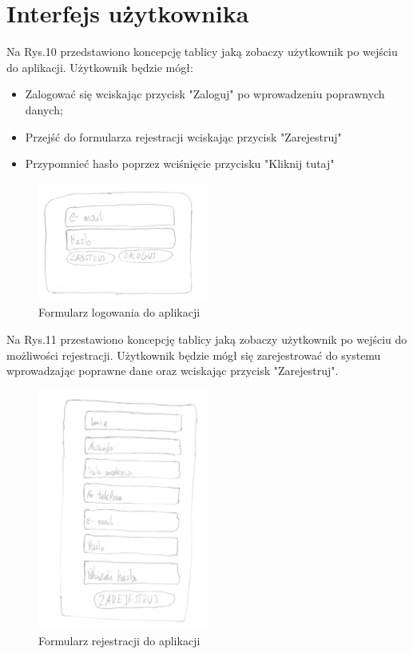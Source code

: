 \documentclass[12pt, letterpaper]{article}
\begin{document}
		\section{Interfejs użytkownika}
		
		Na Rys.10 przedstawiono koncepcję tablicy jaką zobaczy użytkownik po wejściu do aplikacji. Użytkownik będzie mógł:
		\begin{itemize}
				\item Zalogować się wciskając przycisk "Zaloguj" po wprowadzeniu poprawnych danych;
				\item Przejść do formularza rejestracji wciskając przycisk "Zarejestruj"
				\item Przypomnieć hasło poprzez wciśnięcie przycisku "Kliknij tutaj"
		\end{itemize}
		
\begin{figure}[h]
  \centering
      \includegraphics[width=0.5\textwidth]{GUI_logowanie}
  \caption{Formularz logowania do aplikacji}
\end{figure}
	
		
		Na Rys.11 przestawiono koncepcję tablicy jaką zobaczy użytkownik po wejściu do możliwości rejestracji. Użytkownik będzie mógł się zarejestrować do systemu wprowadzając poprawne dane oraz wciskając przycisk "Zarejestruj".
		
\begin{figure}[h]
  \centering
      \includegraphics[width=0.5\textwidth]{GUI_rejestracja}
  \caption{Formularz rejestracji do aplikacji}
\end{figure}
		
\end{document}
